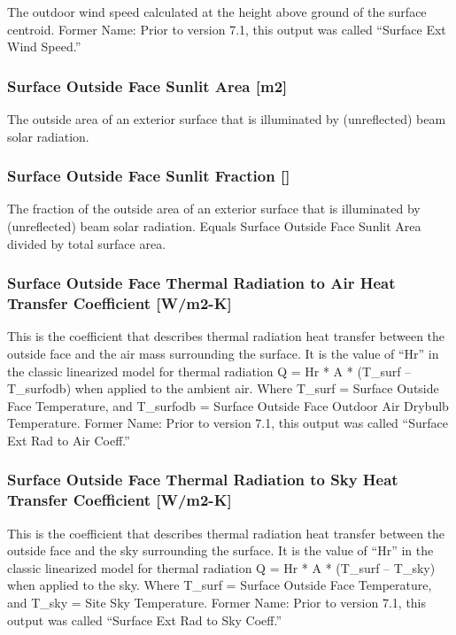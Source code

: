 The outdoor wind speed calculated at the height above ground of the surface centroid. Former Name: Prior to version 7.1, this output was called ``Surface Ext Wind Speed.''

\subsubsection{Surface Outside Face Sunlit Area {[}m2{]}}\label{surface-outside-face-sunlit-area-m2}

The outside area of an exterior surface that is illuminated by (unreflected) beam solar radiation.

\subsubsection{Surface Outside Face Sunlit Fraction {[]}}\label{surface-outside-face-sunlit-fraction}

The fraction of the outside area of an exterior surface that is illuminated by (unreflected) beam solar radiation. Equals Surface Outside Face Sunlit Area divided by total surface area.

\subsubsection{Surface Outside Face Thermal Radiation to Air Heat Transfer Coefficient {[}W/m2-K{]}}\label{surface-outside-face-thermal-radiation-to-air-heat-transfer-coefficient-wm2-k}

This is the coefficient that describes thermal radiation heat transfer between the outside face and the air mass surrounding the surface. It is the value of ``Hr'' in the classic linearized model for thermal radiation Q = Hr * A * (T\_surf -- T\_surfodb) when applied to the ambient air. Where T\_surf = Surface Outside Face Temperature, and T\_surfodb = Surface Outside Face Outdoor Air Drybulb Temperature. Former Name: Prior to version 7.1, this output was called ``Surface Ext Rad to Air Coeff.''

\subsubsection{Surface Outside Face Thermal Radiation to Sky Heat Transfer Coefficient {[}W/m2-K{]}}\label{surface-outside-face-thermal-radiation-to-sky-heat-transfer-coefficient-wm2-k}

This is the coefficient that describes thermal radiation heat transfer between the outside face and the sky surrounding the surface. It is the value of ``Hr'' in the classic linearized model for thermal radiation Q = Hr * A * (T\_surf -- T\_sky) when applied to the sky. Where T\_surf = Surface Outside Face Temperature, and T\_sky = Site Sky Temperature. Former Name: Prior to version 7.1, this output was called ``Surface Ext Rad to Sky Coeff.''

